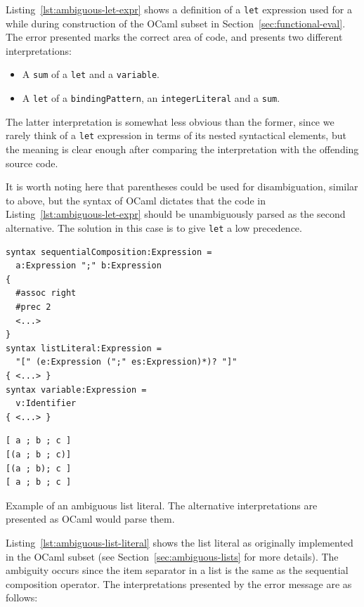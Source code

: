 \documentclass{kththesis}
\begin{document}
Listing~\ref{lst:ambiguous-let-expr} shows a definition of a \texttt{let} expression used for a while during construction of the OCaml subset in Section~\ref{sec:functional-eval}. The error presented marks the correct area of code, and presents two different interpretations:

\begin{itemize}
  \item A \texttt{sum} of a \texttt{let} and a \texttt{variable}.
  \item A \texttt{let} of a \texttt{bindingPattern}, an \texttt{integerLiteral} and a \texttt{sum}.
\end{itemize}

The latter interpretation is somewhat less obvious than the former, since we rarely think of a \texttt{let} expression in terms of its nested syntactical elements, but the meaning is clear enough after comparing the interpretation with the offending source code.

It is worth noting here that parentheses could be used for disambiguation, similar to above, but the syntax of OCaml dictates that the code in Listing~\ref{lst:ambiguous-let-expr} should be unambiguously parsed as the second alternative. The solution in this case is to give \texttt{let} a low precedence.

\begin{listing}[h]
\begin{verbatim}
syntax sequentialComposition:Expression =
  a:Expression ";" b:Expression
{
  #assoc right
  #prec 2
  <...>
}
syntax listLiteral:Expression =
  "[" (e:Expression (";" es:Expression)*)? "]"
{ <...> }
syntax variable:Expression =
  v:Identifier
{ <...> }
\end{verbatim}
\begin{verbatim}
[ a ; b ; c ]
[(a ; b ; c)]
[(a ; b); c ]
[ a ; b ; c ]
\end{verbatim}
\caption{Example of an ambiguous list literal. The alternative interpretations are presented as OCaml would parse them.}
\label{lst:ambiguous-list-literal}
\end{listing}

Listing~\ref{lst:ambiguous-list-literal} shows the list literal as originally implemented in the OCaml subset (see Section~\ref{sec:ambiguous-lists} for more details). The ambiguity occurs since the item separator in a list is the same as the sequential composition operator. The interpretations presented by the error message are as follows:
\end{document}
